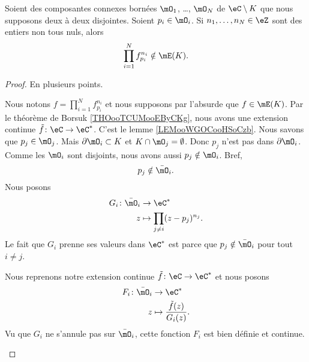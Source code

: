 \begin{lemma}     \label{LEMooOTMGooZeUoCy}
	Soient des composantes connexes bornées \( \mO_1\), \ldots, \( \mO_N\) de \( \eC\setminus K\) que nous supposons deux à deux disjointes. Soient \( p_i\in\mO_i\). Si \( n_1,\ldots, n_N\in \eZ\) sont des entiers non tous nuls, alors
	\begin{equation}
		\prod_{i=1}^Nf_{p_i}^{n_i}\notin\mE(K).
	\end{equation}
\end{lemma}

\begin{proof}
	En plusieurs points.
	\begin{subproof}
		Nous notons \( f=\prod_{i=1}^Nf_{p_i}^{n_i}\) et nous supposons par l'absurde que \( f\in\mE(K)\). Par le théorème de Borsuk \ref{THOooTCUMooEByCKg}, nous avons une extension continue \( \tilde f\colon \eC \to \eC^*\).
		C'est le lemme \ref{LEMooWGOCooHSoCzb}.
		Nous savons que \( p_j\in\mO_j\). Mais \( \partial\mO_i\subset K\) et \( K\cap\mO_j=\emptyset\). Donc \( p_j\) n'est pas dans \( \partial\mO_i\). Comme les \( \mO_i\) sont disjoints, nous avons aussi \( p_j\notin \mO_i\). Bref,
		\begin{equation}
			p_j\notin\bar\mO_i.
		\end{equation}
		Nous posons
		\begin{equation}
			\begin{aligned}
				G_i\colon \bar\mO_i & \to \eC^*                             \\
				z                   & \mapsto \prod_{j\neq i}(z-p_j)^{n_j}.
			\end{aligned}
		\end{equation}
		Le fait que \( G_i\) prenne ses valeurs dans \( \eC^*\) est parce que \( p_j\notin \bar\mO_i\) pour tout \( i\neq j\).

		Nous reprenons notre extension continue \( \tilde f\colon \eC\to \eC^*\) et nous posons
		\begin{equation}
			\begin{aligned}
				F_i\colon \bar\mO_i & \to \eC^*                               \\
				z                   & \mapsto \frac{ \tilde f(z) }{ G_i(z) }.
			\end{aligned}
		\end{equation}
		Vu que \( G_i\) ne s'annule pas sur \( \bar\mO_i\), cette fonction \( F_i\) est bien définie et continue.


\end{subproof}
\end{proof}
